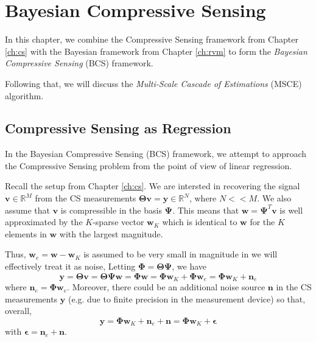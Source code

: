 \chapter{Bayesian Compressive Sensing}
\label{ch:msce}

In this chapter, we combine the Compressive Sensing framework from Chapter \ref{ch:cs} with the Bayesian framework from Chapter \ref{ch:rvm} to form the \emph{Bayesian Compressive Sensing} (BCS) framework.

Following that, we will discuss the \emph{Multi-Scale Cascade of Estimations} (MSCE) algorithm.

\section{Compressive Sensing as Regression}
In the Bayesian Compressive Sensing (BCS) \cite{ji2008} framework, we attempt to approach the Compressive Sensing problem from the point of view of linear regression.

Recall the setup from Chapter \ref{ch:cs}.
We are intersted in recovering the signal $\bm v\in\mathbb{R}^M$ from the CS measurements $\bm\Theta\bm v = \bm y\in\mathbb{R}^N$, where $N << M$.
We also assume that $\bm v$ is compressible in the basis $\bm \Psi$.
This means that $\bm w = \bm\Psi^T\bm v$ is well approximated by the $K$-sparse vector $\bm w_K$ which is identical to $\bm w$ for the $K$ elements in $\bm w$ with the largest magnitude.

Thus, $\bm w_e = \bm w - \bm w_K$ is assumed to be very small in magnitude in we will effectively treat it as noise,
Letting $\bm\Phi=\bm\Theta\bm\Psi$, we have
\begin{equation*}
  \bm y = \bm\Theta\bm v = \bm\Theta\bm\Psi\bm w = \bm\Phi\bm w = \bm\Phi\bm w_K + \bm\Phi\bm w_e = \bm\Phi\bm w_K + \bm n_e
\end{equation*}
where $\bm n_e = \bm\Phi\bm w_e$.
Moreover, there could be an additional noise source $\bm n$ in the CS measurements $\bm y$ (e.g. due to finite precision in the measurement device) so that, overall,
\begin{equation}
\label{eqn:bcs_setup}
  \bm y = \bm\Phi\bm w_K + \bm n_e + \bm n = \bm\Phi\bm w_K + \bm \epsilon
\end{equation}
with $\bm\epsilon = \bm n_e + \bm n$.

